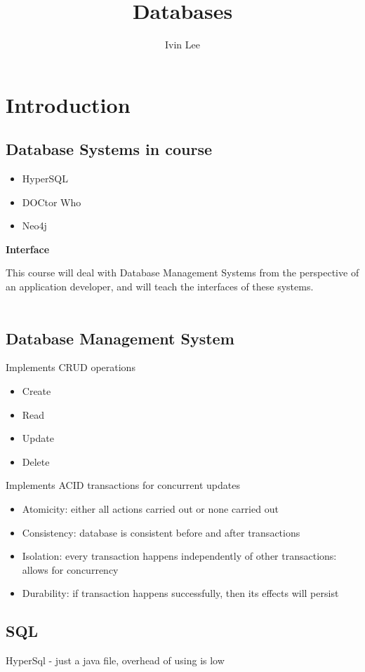 \documentclass[12pt,a4paper]{article} %
\author{Ivin Lee}
\title{Databases}
\begin{document}
\maketitle
\section{Introduction}
\subsection{Database Systems in course}
	\begin{itemize}
	\item HyperSQL
	\item DOCtor Who
	\item Neo4j
	\end{itemize}
\textbf{Interface}

This course will deal with Database Management Systems from the perspective of an application developer, and will teach the interfaces of these systems.
\\\\
\subsection{Database Management System}
Implements CRUD operations
	\begin{itemize}
	\item Create
	\item Read
	\item Update
	\item Delete
	\end{itemize}
Implements ACID transactions for concurrent updates
	\begin{itemize}
	\item Atomicity: either all actions carried out or none carried out
	\item Consistency: database is consistent before and after transactions
	\item Isolation: every transaction happens independently of other transactions: allows for concurrency
	\item Durability: if transaction happens successfully, then its effects will persist
	\end{itemize}

\subsection{SQL}
HyperSql - just a java file, overhead of using is low
\\\\
\end{document}
